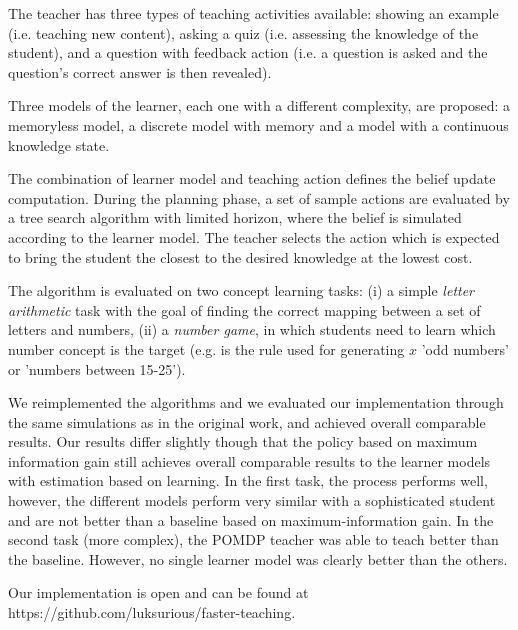 The teacher has three types of teaching activities available: showing an example (i.e. teaching new content), asking a quiz (i.e. assessing the knowledge of the student), and a question with feedback action (i.e. a question is asked and the question's correct answer is then revealed).

Three models of the learner, each one with a different complexity, are proposed: a memoryless model, a discrete model with memory and a model with a continuous knowledge state. 

The combination of learner model and teaching action defines the belief update computation. During the planning phase, a set of sample actions are evaluated by a tree search algorithm with limited horizon, where the belief is simulated according to the learner model. The teacher selects the action which is expected to bring the student the closest to the desired knowledge at the lowest cost.

The algorithm is evaluated on two concept learning tasks: (i) a simple \textit{letter arithmetic} task with the goal of finding the correct mapping between a set of letters and numbers, (ii) a \textit{number game}, in which students need to learn which number concept is the target (e.g. is the rule used for generating $x$ 'odd numbers' or 'numbers between 15-25'). 


We reimplemented the algorithms and we evaluated our implementation through the same simulations as in the original work, and achieved overall comparable results.
Our results differ slightly though that the policy based on maximum information gain still achieves overall comparable results to the learner models with estimation based on learning. 
In the first task, the process performs well, however, the different models perform very similar with a sophisticated student and are not better than a baseline based on maximum-information gain. 
In the second task (more complex), the POMDP teacher was able to teach better than the baseline. However, no single learner model was clearly better than the others.


Our implementation is open and can be found at https://github.com/luksurious/faster-teaching.

